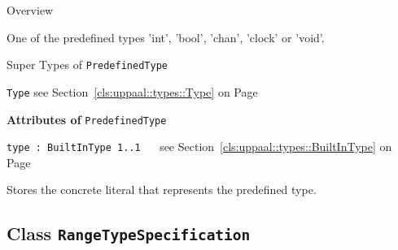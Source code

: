 	\begin{longdescription}
		\item[Overview] 		
				

	

		One of the predefined types 'int', 'bool', 'chan', 'clock' or 'void'.		
		\item[Super Types of \texttt{PredefinedType}] ~
			\begin{longdescription}
				\item[\texttt{Type}] see Section~\ref{cls:uppaal::types::Type} on Page~\pageref{cls:uppaal::types::Type}						\end{longdescription}
		
	
			\item[\textbf{Attributes of} \texttt{PredefinedType}] ~
			\begin{longdescription}
	\item[\texttt{type : BuiltInType 	\symbol{"5B}1..1\symbol{"5D}
}] ~
	see Section~\ref{cls:uppaal::types::BuiltInType} on Page~\pageref{cls:uppaal::types::BuiltInType}
	
	\nopagebreak
		
				

	

		Stores the concrete literal that represents the predefined type.		
			\end{longdescription}
	
	\end{longdescription}
	

\subsection{Class \bfseries \texttt{RangeTypeSpecification}\normalfont}
\label{cls:uppaal::types::RangeTypeSpecification} 
	
